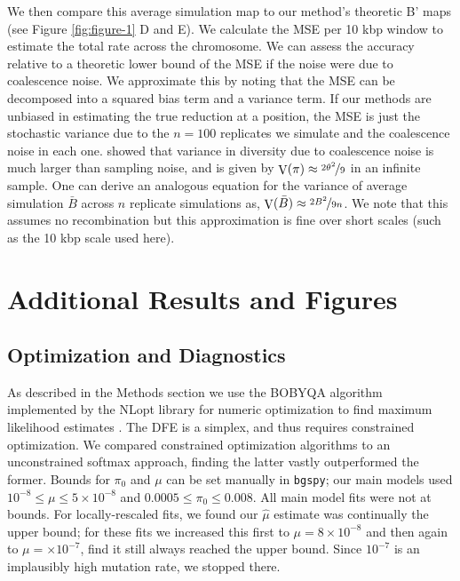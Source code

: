 \documentclass[11pt]{article}
\DeclareMathOperator{\var}{V}
\begin{document}
We then compare this average simulation map to our method's theoretic B' maps
(see Figure \ref{fig:figure-1} D and E). We calculate the MSE per 10 kbp window
to estimate the total rate across the chromosome. We can assess the accuracy
relative to a theoretic lower bound of the MSE if the noise were due to
coalescence noise. We approximate this by noting that the MSE can be decomposed
into a squared bias term and a variance term. If our methods are unbiased in
estimating the true reduction at a position, the MSE is just the stochastic
variance due to the $n=100$ replicates we simulate and the coalescence noise in
each one. \textcite{Tajima1983-gu} showed that variance in diversity due to
coalescence noise is much larger than sampling noise, and is given by
$\var(\pi) \approx \nicefrac{2\theta^2}{9}$ in an infinite sample. One can
derive an analogous equation for the variance of average simulation $\bar{B}$
across $n$ replicate simulations as, $\var(\bar{B}) \approx
\nicefrac{2B^2}{9n}$. We note that this assumes no recombination but this
approximation is fine over short scales (such as the 10 kbp scale used here).

\section{Additional Results and Figures}

\subsection{Optimization and Diagnostics}
\label{supp:optim}

As described in the Methods section we use the BOBYQA algorithm implemented by
the NLopt library for numeric optimization to find maximum likelihood estimates
\parencite{Powell2009-jm,Johnson2007-tl}. The DFE is a simplex, and thus
requires constrained optimization. We compared constrained optimization
algorithms to an unconstrained softmax approach, finding the latter vastly
outperformed the former. Bounds for $\pi_0$ and $\mu$ can be set manually in
\texttt{bgspy}; our main models used $10^{-8} \le \mu \le 5 \times 10^{-8}$ and
$0.0005 \le \pi_0 \le 0.008$. All main model fits were not at bounds. For
locally-rescaled fits, we found our $\widehat{\mu}$ estimate was continually
the upper bound; for these fits we increased this first to $\mu = 8 \times
10^{-8}$ and then again to $\mu = \times 10^{-7}$, find it still always reached
the upper bound. Since $10^{-7}$ is an implausibly high mutation rate, we
stopped there.
\end{document}
